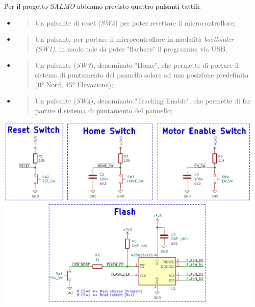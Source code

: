 Per il progetto \emph{SALMO} abbiamo previsto quattro pulsanti tattili:

\begin{itemize}
\item
  \begin{quote}
  Un pulsante di reset (\emph{SW2}) per poter resettare il
  microcontrollore;
  \end{quote}
\item
  \begin{quote}
  Un pulsante per portare il microcontrollore in modalità
  \emph{bootloader (SW1)}, in modo tale da poter "flashare" il
  programma via USB.
  \end{quote}
\item
  \begin{quote}
  Un pulsante (\emph{SW3}), denominato "Home", che permette di portare
  il sistema di puntamento del pannello solare ad una posizione
  predefinita (0° Nord, 45° Elevazione);
  \end{quote}
\item
  \begin{quote}
  Un pulsante (\emph{SW4}), denominato "Tracking Enable", che permette
  di far partire il sistema di puntamento del pannello;
  \end{quote}
\end{itemize}

\begin{center}
  \includegraphics[width=\textwidth]{figures/image16.png}
  \captionsetup{type=figure}
\end{center}


